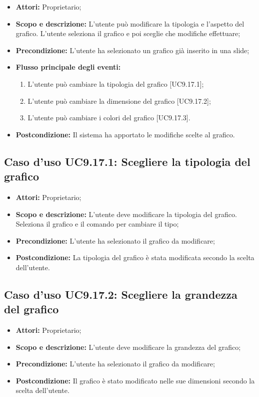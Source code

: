 	\begin{itemize}
		\item \textbf{Attori:} Proprietario;
		\item \textbf{Scopo e descrizione:} L'utente può modificare la tipologia e l'aspetto del grafico. L'utente seleziona il grafico e poi sceglie che modifiche effettuare;
		\item \textbf{Precondizione:} L'utente ha selezionato un grafico già inserito in una \gls{slide};
		\item \textbf{Flusso principale degli eventi:}
		\begin{enumerate}
			\item L'utente può cambiare la tipologia del grafico [UC9.17.1];
			\item L'utente può cambiare la dimensione del grafico [UC9.17.2];
			\item L'utente può cambiare i colori del grafico [UC9.17.3].
		\end{enumerate}
		\item \textbf{Postcondizione:} Il sistema ha apportato le modifiche scelte al grafico.
	\end{itemize}

		\subsection{Caso d'uso UC9.17.1: Scegliere la tipologia del grafico}
		\begin{itemize}
			\item \textbf{Attori:} Proprietario;
			\item \textbf{Scopo e descrizione:} L'utente deve modificare la tipologia del grafico. Seleziona il grafico e il comando per cambiare il tipo;
			\item \textbf{Precondizione:} L'utente ha selezionato il grafico da modificare;
			\item \textbf{Postcondizione:} La tipologia del grafico è stata modificata secondo la scelta dell'utente.
		\end{itemize}
		
		\subsection{Caso d'uso UC9.17.2: Scegliere la grandezza del grafico}
		\begin{itemize}
			\item \textbf{Attori:} Proprietario;
			\item \textbf{Scopo e descrizione:} L'utente deve modificare la grandezza del grafico;
			\item \textbf{Precondizione:} L'utente ha selezionato il grafico da modificare;
			\item \textbf{Postcondizione:} Il grafico è stato modificato nelle sue dimensioni secondo la scelta dell'utente.
		\end{itemize}
		
